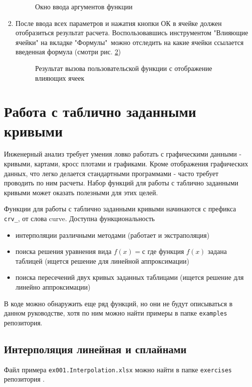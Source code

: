\begin{enumerate}
	\begin{figure}[h!]
		\center{\texttt{[image: Ex10\_3]}}
		\caption{Окно ввода аргументов функции}
		\label{ris:Ex10_3}
	\end{figure}
	
	\item После ввода всех параметров и нажатия кнопки ОК в ячейке должен отобразиться результат расчета. Воспользовавшись инструментом "Влияющие ячейки" на вкладке "Формулы"\ можно отследить на какие ячейки ссылается введенная формула (смотри рис. \ref{ris:Ex10_4})
	\begin{figure}[h!]
		\center{\texttt{[image: Ex10\_4]}}
		\caption{Результат вызова пользовательской функции с отображение влияющих ячеек}
		\label{ris:Ex10_4}
	\end{figure}
\end{enumerate}


\section{Работа с таблично заданными кривыми}
Инженерный анализ требует умения ловко работать с графическими данными - кривыми, картами, кросс плотами и графиками. Кроме отображения графических данных, что легко делается стандартными программами - часто требует проводить по ним расчеты. Набор функций \unf{} для работы с таблично заданными кривыми может оказать полезными для этих целей. 

Функции \unf{} для работы с таблично заданными кривыми начинаются с префикса \texttt{crv_}, от слова curve. Доступна функциональность
\begin{itemize}	
	\item интерполяции различными методами (работает и экстраполяция)
	\item поиска решения уравнения вида $f(x) = с$ где функция $f(x)$ задана таблицей (ищется решение для линейной аппроксимации)
	\item поиска пересечений двух кривых заданных таблицами (ищется решение для линейно аппроксимации)	
\end{itemize}
В коде можно обнаружить еще ряд функций, но они не будут описываться в данном руководстве, хотя по ним можно найти примеры в папке \texttt{examples} репозитория.

\subsection{Интерполяция линейная и сплайнами}
Файл примера \texttt{ex001.Interpolation.xlsx} можно найти в папке \texttt{exercises} репозитория \unf{}.

